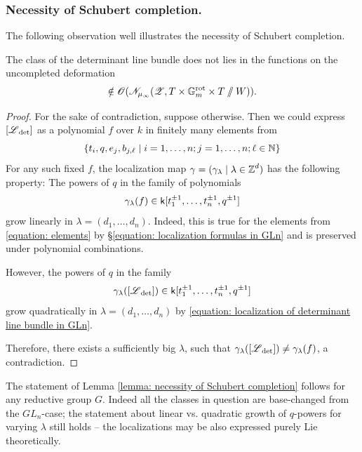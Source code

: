 \subsubsection{Necessity of Schubert completion.}
The following observation well illustrates the necessity of Schubert completion.
\begin{lemma}\label{lemma: necessity of Schubert completion}
The class of the determinant line bundle does not lies in the functions on the uncompleted deformation
\begin{equation*}
    [\eL_{\det}] \notin \O(\eN_{\mu_{\infty}}(\eZ, T \times \Gm^{\rot} \times T \sslash W)).
\end{equation*}
\end{lemma}
\begin{proof}
For the sake of contradiction, suppose otherwise. Then we could express $[\operatorname{\mathscr{L}}_{\det}]$ as a polynomial $f$ over $k$ in finitely many elements from
\begin{equation}\label{equation: elements}
 \{ t_i, q, e_j, b_{j, \ell} \mid i = 1, \dots, n; j = 1, \dots, n; \ell \in \operatorname{\mathbb{N}} \}   
\end{equation}
For any such fixed $f$, the localization map $\gamma = (\gamma_{\lambda} \mid \lambda \in \operatorname{\mathbb{Z}}^d)$ has the following property: The powers of $q$ in the family of polynomials
\begin{equation*}
 \gamma_{\lambda}(f) \in \mathsf{k}[t_1^{\pm 1}, \dots, t^{\pm 1}_n, q^{\pm 1}]   
\end{equation*}
grow linearly in $\lambda = (d_1, \dots, d_n)$. Indeed, this is true for the elements from \eqref{equation: elements} by \S \ref{equation: localization formulas in GLn} and is preserved under polynomial combinations.

However, the powers of $q$ in the family
\begin{equation*}
 \gamma_{\lambda}([\operatorname{\mathscr{L}}_{\det}]) \in \mathsf{k}[t_1^{\pm 1}, \dots, t^{\pm 1}_n, q^{\pm 1}]   
\end{equation*}
grow quadratically in $\lambda = (d_1, \dots, d_n)$ by \eqref{equation: localization of determinant line bundle in GLn}.

Therefore, there exists a sufficiently big $\lambda$, such that $\gamma_{\lambda}([\operatorname{\mathscr{L}}_{\det}]) \neq \gamma_{\lambda}(f)$, a contradiction.
\end{proof}

\begin{remark}
The statement of Lemma \ref{lemma: necessity of Schubert completion} follows for any reductive group $G$. Indeed all the classes in question are base-changed from the $GL_n$-case; the statement about linear vs. quadratic growth of $q$-powers for varying $\lambda$ still holds -- the localizations may be also expressed purely Lie theoretically.
\end{remark}

